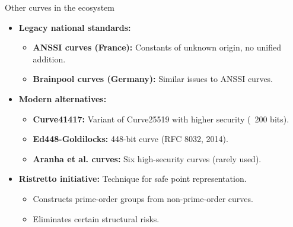 \documentclass[aspectratio=169, lualatex, handout]{beamer}
\begin{document}
\begin{frame}{Other curves in the ecosystem}
	\begin{itemize}[<+->]
		\item \textbf{Legacy national standards:}
		      \begin{itemize}
			      \item \textbf{ANSSI curves (France):} Constants of unknown origin, no unified addition.
			      \item \textbf{Brainpool curves (Germany):} Similar issues to ANSSI curves.
		      \end{itemize}
		\item \textbf{Modern alternatives:}
		      \begin{itemize}
			      \item \textbf{Curve41417:} Variant of Curve25519 with higher security (~200 bits).
			      \item \textbf{Ed448-Goldilocks:} 448-bit curve (RFC 8032, 2014).
			      \item \textbf{Aranha et al. curves:} Six high-security curves (rarely used).
		      \end{itemize}
		\item \textbf{Ristretto initiative:} Technique for safe point representation.
		      \begin{itemize}
			      \item Constructs prime-order groups from non-prime-order curves.
			      \item Eliminates certain structural risks.
		      \end{itemize}
	\end{itemize}
\end{frame}
\end{document}
